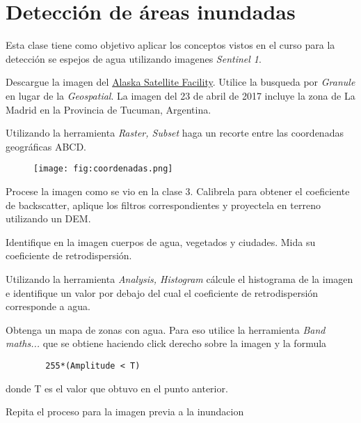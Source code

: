 \chapter{Detección de áreas inundadas}

Esta clase tiene como objetivo aplicar los conceptos vistos en el curso para la detección se espejos de agua utilizando imagenes \emph{Sentinel 1}.





\begin{que}
    Descargue la imagen  del \href{https://vertex.daac.asf.alaska.edu/}{Alaska Satellite Facility}. Utilice la busqueda por \emph{Granule} en lugar de la \emph{Geospatial}. La imagen del 23 de abril de 2017 incluye la zona de La Madrid en la Provincia de Tucuman, Argentina.
\end{que}

\begin{que}
    Utilizando la herramienta \emph{Raster, Subset} haga un recorte entre las coordenadas geográficas ABCD.
    \begin{figure}[h!]
        \centering
        \texttt{[image: fig:coordenadas.png]}
        \caption{}
        \label{}
    \end{figure}
\end{que}

\begin{que}
    Procese la imagen como se vio en la clase 3. Calibrela para obtener el coeficiente de backscatter, aplique los filtros correspondientes y proyectela en terreno utilizando un DEM.
\end{que}

\begin{que}
    Identifique en la imagen cuerpos de agua, vegetados y ciudades. Mida su coeficiente de retrodispersión.
\end{que}

\begin{que}
    Utilizando la herramienta \emph{Analysis, Histogram} cálcule el histograma de la imagen e identifique un valor por debajo del cual el coeficiente de retrodispersión corresponde a agua.
\end{que}

\begin{que}
    Obtenga un mapa de zonas con agua. Para eso utilice la herramienta \emph{Band maths...} que se obtiene haciendo click derecho sobre la imagen y la formula
    \begin{verbatim}
        255*(Amplitude < T)
    \end{verbatim}
    donde T es el valor que obtuvo en el punto anterior.
\end{que}

\begin{que}
    Repita el proceso para la imagen  previa a la inundacion
\end{que}
